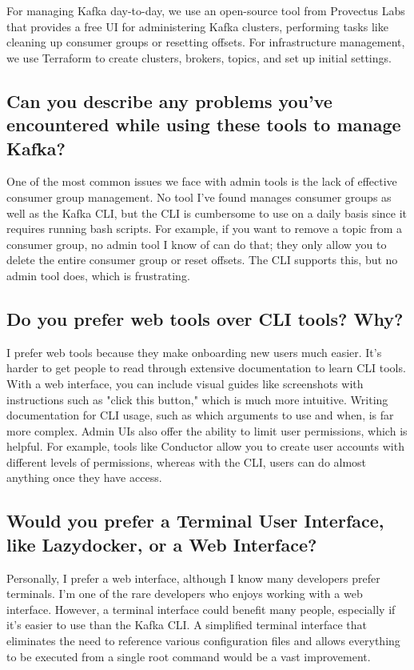 \documentclass[10pt , a4paper]{report}
\begin{document}
For managing Kafka day-to-day, we use an open-source tool from Provectus Labs that provides a free UI for administering Kafka clusters, performing tasks like cleaning up consumer groups or resetting offsets. For infrastructure management, we use Terraform to create clusters, brokers, topics, and set up initial settings.

\subsection*{Can you describe any problems you've encountered while using these tools to manage Kafka?}

One of the most common issues we face with admin tools is the lack of effective consumer group management. No tool I've found manages consumer groups as well as the Kafka CLI, but the CLI is cumbersome to use on a daily basis since it requires running bash scripts. For example, if you want to remove a topic from a consumer group, no admin tool I know of can do that; they only allow you to delete the entire consumer group or reset offsets. The CLI supports this, but no admin tool does, which is frustrating.

\subsection*{Do you prefer web tools over CLI tools? Why?}

I prefer web tools because they make onboarding new users much easier. It's harder to get people to read through extensive documentation to learn CLI tools. With a web interface, you can include visual guides like screenshots with instructions such as "click this button," which is much more intuitive. Writing documentation for CLI usage, such as which arguments to use and when, is far more complex. Admin UIs also offer the ability to limit user permissions, which is helpful. For example, tools like Conductor allow you to create user accounts with different levels of permissions, whereas with the CLI, users can do almost anything once they have access.

\subsection*{Would you prefer a Terminal User Interface, like Lazydocker, or a Web Interface?}

Personally, I prefer a web interface, although I know many developers prefer terminals. I’m one of the rare developers who enjoys working with a web interface. However, a terminal interface could benefit many people, especially if it’s easier to use than the Kafka CLI. A simplified terminal interface that eliminates the need to reference various configuration files and allows everything to be executed from a single root command would be a vast improvement.
\end{document}
